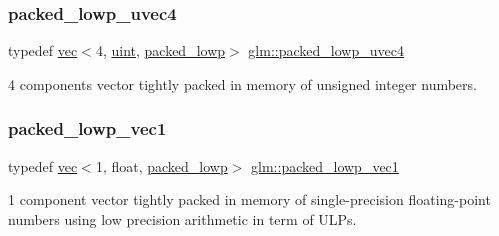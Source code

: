 \mbox{\label{group__gtc__type__aligned_gaddae01027a0dc8e3d953a3ca68b5a0cd}} 
\subsubsection{\texorpdfstring{packed\+\_\+lowp\+\_\+uvec4}{packed\_lowp\_uvec4}}
{\footnotesize\ttfamily typedef \hyperlink{structglm_1_1vec}{vec}$<$4, \hyperlink{group__core__precision_ga4fd29415871152bfb5abd588334147c8}{uint}, \hyperlink{namespaceglm_a36ed105b07c7746804d7fdc7cc90ff25ac36a4bd74559be2c0b65bc48e5953b8b}{packed\+\_\+lowp}$>$ \hyperlink{group__gtc__type__aligned_gaddae01027a0dc8e3d953a3ca68b5a0cd}{glm\+::packed\+\_\+lowp\+\_\+uvec4}}



4 components vector tightly packed in memory of unsigned integer numbers. 

\mbox{\label{group__gtc__type__aligned_ga23472ebc3f98baab2a17053bc3788a9c}} 
\subsubsection{\texorpdfstring{packed\+\_\+lowp\+\_\+vec1}{packed\_lowp\_vec1}}
{\footnotesize\ttfamily typedef \hyperlink{structglm_1_1vec}{vec}$<$1, float, \hyperlink{namespaceglm_a36ed105b07c7746804d7fdc7cc90ff25ac36a4bd74559be2c0b65bc48e5953b8b}{packed\+\_\+lowp}$>$ \hyperlink{group__gtc__type__aligned_ga23472ebc3f98baab2a17053bc3788a9c}{glm\+::packed\+\_\+lowp\+\_\+vec1}}



1 component vector tightly packed in memory of single-\/precision floating-\/point numbers using low precision arithmetic in term of U\+L\+Ps. 

\mbox{\label{group__gtc__type__aligned_ga5457fdfd08276277a86cb27e1da6aa9c}} 
